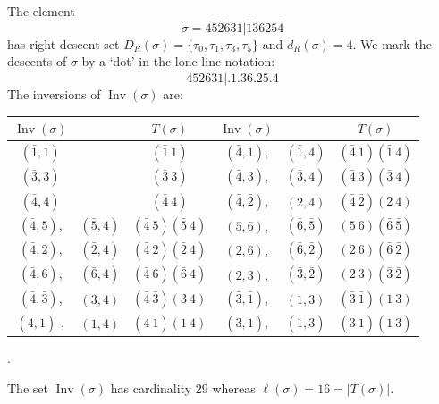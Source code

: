 \documentclass[ALCO,Unicode]{cedram}
\theoremstyle{definition}
\DeclareMathOperator{\invs}{Inv}
\begin{document}
\begin{ex}\label{ex:TypeB2} The element
$$
\sigma=4 \bar{5} \bar{2} \bar{6} 3 1 | \bar{1} \bar{3} 6 2 5 \bar{4}
$$
has right descent set $D_R(\sigma)=\{\tau_0,\tau_1,\tau_3,\tau_5\}$ and $d_R(\sigma)=4$. We mark the descents of $\sigma$ by a `dot' in the lone-line notation:
\begin{equation*}
4  \bar{5} \bar{2}  \bar{6} 3 1 | . \bar{1} . \bar{3} 6 . 2 5 . \bar{4}
\end{equation*}
The inversions of $\invs(\sigma)$ are:

\renewcommand{\arraystretch}{1.5}
\begin{center}
\begin{tabular}{|cc|c|cc|c|}
\hline
$\invs(\sigma)$&                    &$T(\sigma)$& $\invs(\sigma)$&         &$T(\sigma)$\\
\hline        
$(\bar{1}, 1)$       &                 &     $(\bar{1}\ 1)$             &$(\bar{4}, 1)$,       & $(\bar{1}, 4)$& $(\bar{4}\ 1)(\bar{1}\ 4)$\\
$(\bar{3}, 3)$       &                 &    $(\bar{3}\ 3) $           &$(\bar{4}, 3)$,       & $(\bar{3}, 4)$&$(\bar{4}\ 3)(\bar{3}\ 4)$ \\
$(\bar{4}, 4)$       &                 &   $ (\bar{4}\ 4)$             &$(\bar{4}, \bar{2})$, & $(2, 4)$& $(\bar{4}\ \bar{2})(2\ 4)$\\
$(\bar{4}, 5)$,       & $(\bar{5}, 4)$  & $(\bar{4}\ 5)(\bar{5}\ 4)$            & $(5, 6)$,             & $(\bar{6}, \bar{5})$&$(5\ 6)(\bar{6}\ \bar{5})$ \\
$(\bar{4}, 2)$,       & $(\bar{2}, 4)$ &  $(\bar{4}\ 2)(\bar{2}\ 4)$            & $(2, 6)$,             & $(\bar{6}, \bar{2})$&$(2\ 6)(\bar{6}\ \bar{2})$ \\
$(\bar{4}, 6)$,       & $(\bar{6}, 4)$ &   $(\bar{4}\ 6)(\bar{6}\ 4)$             & $(2, 3)$,             & $(\bar{3}, \bar{2})$&$(2\ 3)(\bar{3}\ \bar{2})$ \\
$(\bar{4}, \bar{3})$, & $(3, 4)$       &   $(\bar{4}\ \bar{3})(3\ 4)$               &$(\bar{3}, \bar{1})$, & $(1, 3)$&$(\bar{3}\ \bar{1})(1\ 3)$ \\
$(\bar{4}, \bar{1})$ ,& $(1, 4)$       &   $(\bar{4}\ \bar{1})(1\ 4)$                 & $(\bar{3}, 1)$,       & $(\bar{1}, 3)$&$(\bar{3}\ 1)(\bar{1}\ 3)$ \\
\hline
\end{tabular}.
\end{center}
The set $\invs(\sigma)$ has cardinality $29$ whereas $\ell(\sigma)=16=|T(\sigma)|$.  
\end{ex}
\end{document}
